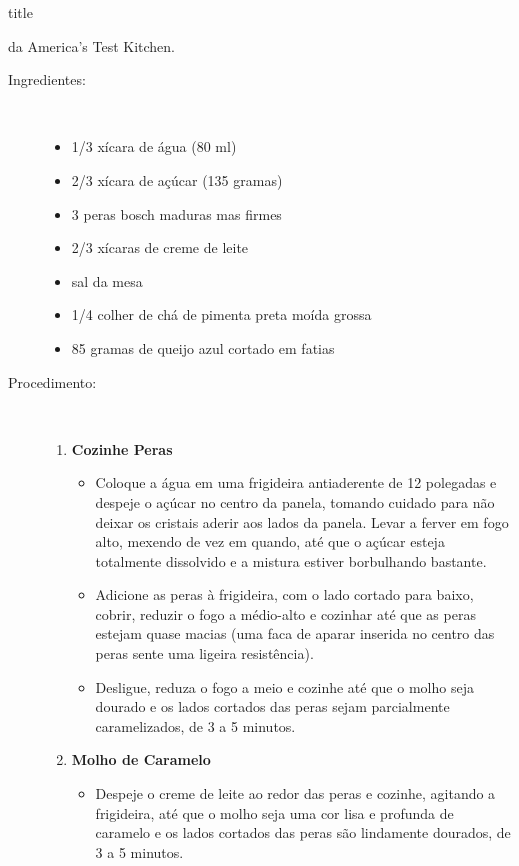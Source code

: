\documentclass [11pt, letterpaper] {article}
\begin{document}
 {title}

\begin {flushright}
{\hspace {4in} da America's Test Kitchen.}
\end {flushright}



\begin {description}

\item [Ingredientes:] \ \\
\begin {itemize}
\item 1/3 xícara de água (80 ml)
\item 2/3 xícara de açúcar (135 gramas)
\item 3 peras bosch maduras mas firmes
\item 2/3 xícaras de creme de leite
\item sal da mesa
\item 1/4 colher de chá de pimenta preta moída grossa
\item 85 gramas de queijo azul cortado em fatias
\end {itemize}

\item [Procedimento:] \ \\

\begin {enumerate}
\item {\bf Cozinhe Peras}
\begin {itemize}
\item Coloque a água em uma frigideira antiaderente de 12 polegadas e despeje o açúcar no centro da panela, tomando cuidado para não deixar os cristais aderir aos lados da panela. Levar a ferver em fogo alto, mexendo de vez em quando, até que o açúcar esteja totalmente dissolvido e a mistura estiver borbulhando bastante.
\item Adicione as peras à frigideira, com o lado cortado para baixo, cobrir, reduzir o fogo a médio-alto e cozinhar até que as peras estejam quase macias (uma faca de aparar inserida no centro das peras sente uma ligeira resistência).
\item Desligue, reduza o fogo a meio e cozinhe até que o molho seja dourado e os lados cortados das peras sejam parcialmente caramelizados, de 3 a 5 minutos.
\end {itemize}

\item {\bf Molho de Caramelo}
\begin {itemize}
\item Despeje o creme de leite ao redor das peras e cozinhe, agitando a frigideira, até que o molho seja uma cor lisa e profunda de caramelo e os lados cortados das peras são lindamente dourados, de 3 a 5 minutos.
\end {itemize}


\end{enumerate}
\end{description}
\end{document}
